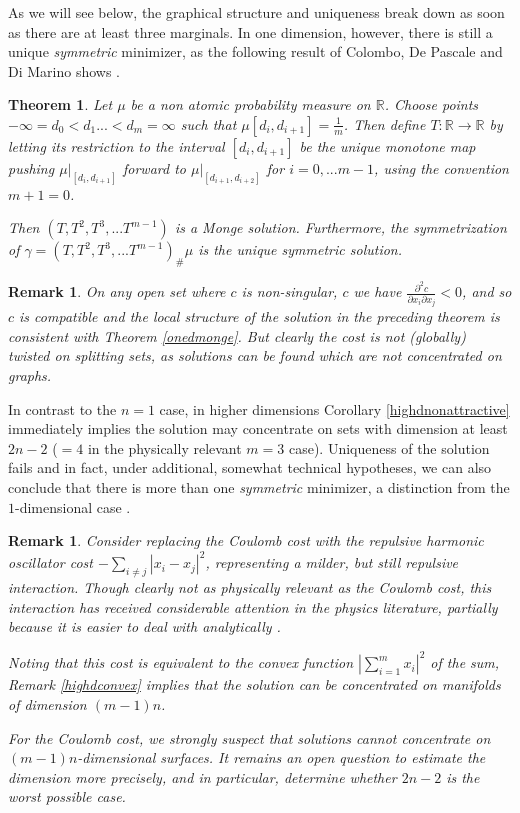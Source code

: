 \documentclass[letter,10pt]{article}
\theoremstyle{dotless}
\begin{document}
As we will see below, the graphical structure and uniqueness break down as soon as there are at least three marginals.  In one dimension, however, there is still a unique \textit{symmetric} minimizer, as the following result of Colombo, De Pascale and Di Marino  shows \cite{cdpdm}.

\newtheorem{dft1d}[semiclasslim]{Theorem}
\begin{dft1d}\label{dft1d}
Let $\mu$ be a  non  atomic  probability measure on $\mathbb{R}$. Choose points $-\infty =d_0 <d_1...<d_m = \infty$ such that $\mu[d_i,d_{i+1}] =\frac{1}{m}$.  Then define $T:\mathbb{R} \rightarrow \mathbb{R}$ by letting its restriction to the interval $[d_i,d_{i+1}]$ be the unique monotone map pushing $\mu|_{[d_i,d_{i+1}]}$ forward to $\mu|_{[d_{i+1},d_{i+2}]}$ for $i=0,...m-1$, using the convention $m+1 =0$.

Then $(T,T^2,T^3,...T^{m-1})$ is a Monge solution.  Furthermore, the symmetrization of $\gamma=(T,T^2,T^3,...T^{m-1})_{\#}\mu$ is the unique symmetric solution.
\end{dft1d}
\newtheorem{localmono}[semiclasslim]{Remark}

\begin{localmono}
On any open set where $c$ is non-singular, $c$ we have $\frac{\partial^2 c}{\partial x_i \partial x_j} <0$, and so $c$ is compatible and the local structure of  the solution in the preceding theorem is consistent with Theorem \ref{onedmonge}.  But clearly the cost is not (globally) twisted on splitting sets, as solutions can be found which are not concentrated on graphs.
\end{localmono}
In contrast to the $n=1$ case, in higher dimensions Corollary \ref{highdnonattractive} immediately implies the solution may concentrate on sets with dimension at least $2n-2$ ($=4$ in the physically relevant $m=3$ case).  Uniqueness of the solution fails and in fact, under additional, somewhat technical hypotheses, we can also conclude that there is more than one \emph{symmetric} minimizer, a distinction from the  $1$-dimensional case \cite{P13b}.


\newtheorem{quaddft}[semiclasslim]{Remark}
\begin{quaddft}
Consider replacing the Coulomb cost with the repulsive harmonic oscillator cost $-\sum_{i\neq j} |x_i-x_j|^2$, representing a milder, but still repulsive interaction.  Though clearly not as physically relevant as the Coulomb cost, this interaction has received considerable attention in the physics literature, partially because it is easier to deal with analytically \cite{bdpgg}\cite{sggs}.
 
Noting that this cost is equivalent to the convex function $|\sum_{i=1}^mx_i|^2$ of the sum, Remark \ref{highdconvex} implies that the solution can be concentrated on manifolds of dimension $(m-1)n$.

For the Coulomb cost, we strongly suspect that solutions cannot concentrate on $(m-1)n$-dimensional surfaces.  It remains an open question to estimate the dimension more precisely, and in particular, determine whether $2n-2$ is the worst possible case.
\end{quaddft}
\end{document}
